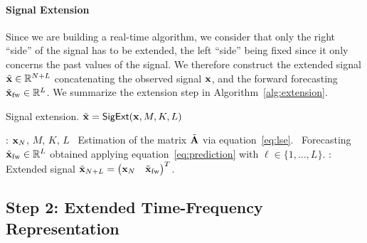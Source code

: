 \paragraph{Signal Extension} Since we are building a real-time algorithm, we consider that only the right ``side'' of the signal has to be extended, the left ``side'' being fixed since it only concerns the past values of the signal. We therefore construct the extended signal $\tilde{{\mathbf x}}\in{\mathbb R}^{N+L}$ concatenating the observed signal ${\mathbf x}$, and the forward forecasting $\tilde{{\mathbf x}}_{\mathrm{fw}}\in{\mathbb R}^L$. We summarize the extension step in Algorithm~\ref{alg:extension}. %

\begin{algorithm}
\caption{Signal extension. $\tilde{{\mathbf x}} = \relax{\sf SigExt}({\mathbf x},M,K,L)$}
\label{alg:extension}
\begin{algorithmic}
: ${\mathbf x}_N$, $M$, $K$, $L$
\STATE \vspace{-2mm}
\STATE \quad\textbullet\ Estimation of the matrix $\tilde{{\mathbf A}}$ via equation~\eqref{eq:lse}.
\STATE \quad\textbullet\ Forecasting $\tilde{{\mathbf x}}_{\mathrm{fw}}\in{\mathbb R}^L$ obtained applying equation~\eqref{eq:prediction} with $\ell\in\{1,\ldots,L\}$.
\STATE \vspace{-2mm}
: Extended signal $\tilde{{\mathbf x}}_{N+L} = \begin{pmatrix} {\mathbf x}_N & \tilde{{\mathbf x}}_{\mathrm{fw}}\end{pmatrix}^T$. %
\end{algorithmic}
\end{algorithm}

\subsection{Step 2: Extended Time-Frequency Representation}
\label{sse:extension.TFR}
 
